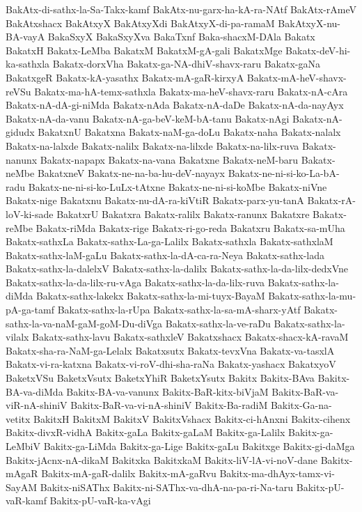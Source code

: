 {BakAtx-di-sathx-la-Sa-Takx-kamf
BakAtx-nu-garx-ha-kA-ra-NAtf
BakAtx-rAmeV
BakAtxshacx
BakAtxyX
BakAtxyXdi
BakAtxyX-di-pa-ramaM
BakAtxyX-nu-BA-vayA
BakaSxyX
BakaSxyXva
BakaTxnf
Baka-shacxM-DAla
Bakatx
BakatxH
Bakatx-LeMba
BakatxM
BakatxM-gA-gali
BakatxMge
Bakatx-deV-hi-ka-sathxla
Bakatx-dorxVha
Bakatx-ga-NA-dhiV-shavx-raru
Bakatx-gaNa
BakatxgeR
Bakatx-kA-yasathx
Bakatx-mA-gaR-kirxyA
Bakatx-mA-heV-shavx-reVSu
Bakatx-ma-hA-temx-sathxla
Bakatx-ma-heV-shavx-raru
Bakatx-nA-cAra
Bakatx-nA-dA-gi-niMda
Bakatx-nAda
Bakatx-nA-daDe
Bakatx-nA-da-nayAyx
Bakatx-nA-da-vanu
Bakatx-nA-ga-beV-keM-bA-tanu
Bakatx-nAgi
Bakatx-nA-gidudx
BakatxnU
Bakatxna
Bakatx-naM-ga-doLu
Bakatx-naha
Bakatx-nalalx
Bakatx-na-lalxde
Bakatx-nalilx
Bakatx-na-lilxde
Bakatx-na-lilx-ruva
Bakatx-nanunx
Bakatx-napapx
Bakatx-na-vana
Bakatxne
Bakatx-neM-baru
Bakatx-neMbe
BakatxneV
Bakatx-ne-na-ba-hu-deV-nayayx
Bakatx-ne-ni-si-ko-La-bA-radu
Bakatx-ne-ni-si-ko-LuLx-tAtxne
Bakatx-ne-ni-si-koMbe
Bakatx-niVne
Bakatx-nige
Bakatxnu
Bakatx-nu-dA-ra-kiVtiR
Bakatx-parx-yu-tanA
Bakatx-rA-loV-ki-sade
BakatxrU
Bakatxra
Bakatx-ralilx
Bakatx-ranunx
Bakatxre
Bakatx-reMbe
Bakatx-riMda
Bakatx-rige
Bakatx-ri-go-reda
Bakatxru
Bakatx-sa-mUha
Bakatx-sathxLa
Bakatx-sathx-La-ga-Lalilx
Bakatx-sathxla
Bakatx-sathxlaM
Bakatx-sathx-laM-gaLu
Bakatx-sathx-la-dA-ca-ra-Neya
Bakatx-sathx-lada
Bakatx-sathx-la-dalelxV
Bakatx-sathx-la-dalilx
Bakatx-sathx-la-da-lilx-dedxVne
Bakatx-sathx-la-da-lilx-ru-vAga
Bakatx-sathx-la-da-lilx-ruva
Bakatx-sathx-la-diMda
Bakatx-sathx-lakekx
Bakatx-sathx-la-mi-tuyx-BayaM
Bakatx-sathx-la-mu-pA-ga-tamf
Bakatx-sathx-la-rUpa
Bakatx-sathx-la-sa-mA-sharx-yAtf
Bakatx-sathx-la-va-naM-gaM-goM-Du-diVga
Bakatx-sathx-la-ve-raDu
Bakatx-sathx-la-vilalx
Bakatx-sathx-lavu
Bakatx-sathxleV
Bakatxshacx
Bakatx-shacx-kA-ravaM
Bakatx-sha-ra-NaM-ga-Lelalx
Bakatxsutx
Bakatx-tevxVna
Bakatx-va-tasxlA
Bakatx-vi-ra-katxna
Bakatx-vi-roV-dhi-sha-raNa
Bakatx-yashacx
BakatxyoV
BaketxVSu
BaketxVsutx
BaketxYhiR
BaketxYsutx
Bakitx
Bakitx-BAva
Bakitx-BA-va-diMda
Bakitx-BA-va-vanunx
Bakitx-BaR-kitx-biVjaM
Bakitx-BaR-va-viR-nA-shiniV
Bakitx-BaR-va-vi-nA-shiniV
Bakitx-Ba-radiM
Bakitx-Ga-na-vetitx
BakitxH
BakitxM
BakitxV
BakitxVshacx
Bakitx-ci-hAnxni
Bakitx-cihenx
Bakitx-divxR-vidhA
Bakitx-gaLa
Bakitx-gaLaM
Bakitx-ga-Lalilx
Bakitx-ga-LeMbiV
Bakitx-ga-LiMda
Bakitx-ga-Lige
Bakitx-gaLu
Bakitxge
Bakitx-gi-daMga
Bakitx-jAcnx-nA-dikaM
Bakitxka
BakitxkaM
Bakitx-liV-lA-vi-noV-dane
Bakitx-mAgaR
Bakitx-mA-gaR-dalilx
Bakitx-mA-gaRvu
Bakitx-ma-dhAyx-tamx-vi-SayAM
Bakitx-niSAThx
Bakitx-ni-SAThx-va-dhA-na-pa-ri-Na-taru
Bakitx-pU-vaR-kamf
Bakitx-pU-vaR-ka-vAgi
}
